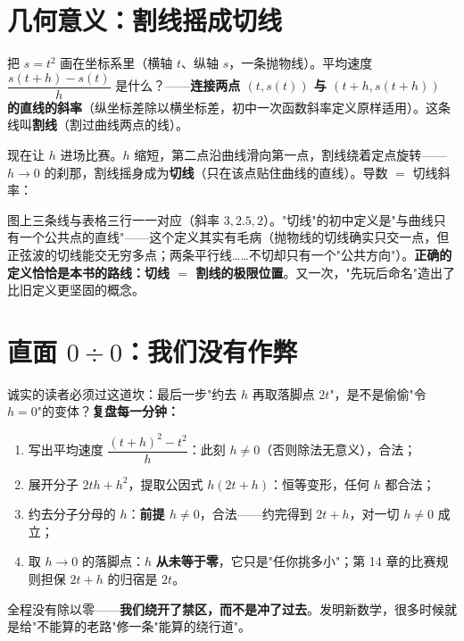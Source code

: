 \section{几何意义：割线摇成切线}

把 $s = t^2$ 画在坐标系里（横轴 $t$、纵轴 $s$，一条抛物线）。平均速度 $\dfrac{s(t+h) - s(t)}{h}$ 是什么？——\textbf{连接两点 $(t, s(t))$ 与 $(t+h, s(t+h))$ 的直线的斜率}（纵坐标差除以横坐标差，初中一次函数斜率定义原样适用）。这条线叫\textbf{割线}（割过曲线两点的线）。

现在让 $h$ 进场比赛。$h$ 缩短，第二点沿曲线滑向第一点，割线绕着定点旋转——$h\to0$ 的刹那，割线摇身成为\textbf{切线}（只在该点贴住曲线的直线）。导数 $=$ 切线斜率：


图上三条线与表格三行一一对应（斜率 $3, 2.5, 2$）。"切线"的初中定义是"与曲线只有一个公共点的直线"——这个定义其实有毛病（抛物线的切线确实只交一点，但正弦波的切线能交无穷多点；两条平行线……不切却只有一个"公共方向"）。\textbf{正确的定义恰恰是本书的路线：切线 $=$ 割线的极限位置}。又一次，"先玩后命名"造出了比旧定义更坚固的概念。

\section{直面 $0\div0$：我们没有作弊}

诚实的读者必须过这道坎：最后一步"约去 $h$ 再取落脚点 $2t$"，是不是偷偷"令 $h = 0$"的变体？\textbf{复盘每一分钟：}
\begin{enumerate}
\item 写出平均速度 $\dfrac{(t+h)^2 - t^2}{h}$：此刻 $h \ne 0$（否则除法无意义），合法；
\item 展开分子 $2th + h^2$，提取公因式 $h(2t+h)$：恒等变形，任何 $h$ 都合法；
\item 约去分子分母的 $h$：\textbf{前提 $h\ne0$}，合法——约完得到 $2t + h$，对一切 $h\ne0$ 成立；
\item 取 $h\to0$ 的落脚点：$h$ \textbf{从未等于零}，它只是"任你挑多小"；第 14 章的比赛规则担保 $2t + h$ 的归宿是 $2t$。
\end{enumerate}
全程没有除以零——\textbf{我们绕开了禁区，而不是冲了过去}。发明新数学，很多时候就是给"不能算的老路"修一条"能算的绕行道"。

